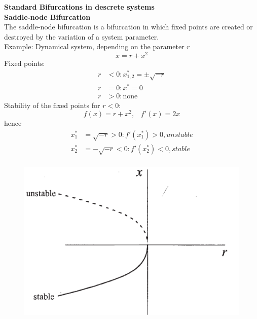 \textbf{Standard Bifurcations in descrete systems}\\
\textbf{Saddle-node Bifurcation}\\
The saddle-node bifurcation is a bifurcation in which fixed points are created or destroyed by the variation of a system parameter.\\
Example: Dynamical system, depending on the parameter $r$
\begin{equation}
  \dot{x} = r + x^2
\end{equation}
Fixed points:
\begin{equation}
  \begin{split}
    r& < 0: x^*_{1, 2} = \pm\sqrt{-r}\\
    r& = 0: x^* = 0\\
    r& > 0: \text{none}
  \end{split}
\end{equation}
Stability of the fixed points for $r<0$:
\begin{equation}
  f(x) = r + x^2, \;\;\; f'(x) = 2x
\end{equation}
hence
\begin{equation}
  \begin{split}
    x^*_1 &= \sqrt{-r} > 0: f'(x^*_1) > 0, unstable\\
    x^*_2 &= -\sqrt{-r} < 0: f'(x^*_2) < 0, stable\\
  \end{split}
\end{equation}
\begin{figure}[H]
  \centering
  \includegraphics[width=.5\linewidth]{Pics/9.1.png}
\end{figure}

